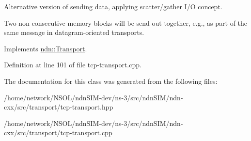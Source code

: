 Alternative version of sending data, applying scatter/gather I/O concept. 

Two non-\/consecutive memory blocks will be send out together, e.\+g., as part of the same message in datagram-\/oriented transports. 

Implements \hyperlink{classndn_1_1Transport_aa27593978570e95a5793b2af0dac3568}{ndn\+::\+Transport}.



Definition at line 101 of file tcp-\/transport.\+cpp.



The documentation for this class was generated from the following files\+:\begin{DoxyCompactItemize}
\item 
/home/network/\+N\+S\+O\+L/ndn\+S\+I\+M-\/dev/ns-\/3/src/ndn\+S\+I\+M/ndn-\/cxx/src/transport/tcp-\/transport.\+hpp\item 
/home/network/\+N\+S\+O\+L/ndn\+S\+I\+M-\/dev/ns-\/3/src/ndn\+S\+I\+M/ndn-\/cxx/src/transport/tcp-\/transport.\+cpp\end{DoxyCompactItemize}
